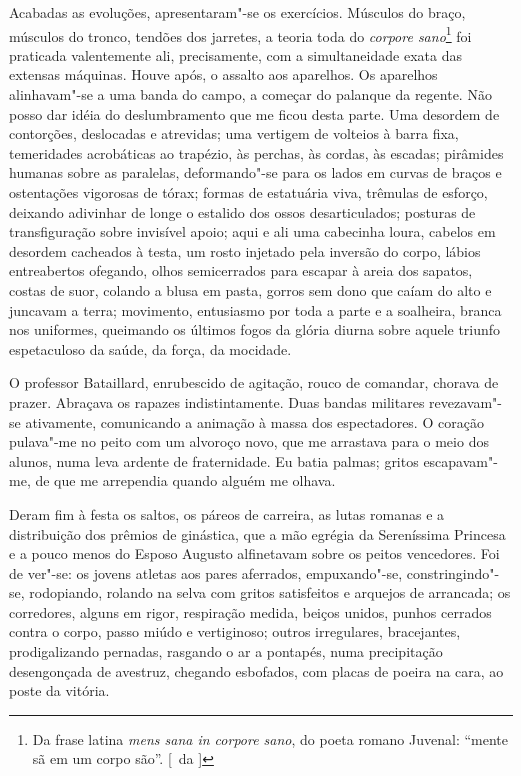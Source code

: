 Acabadas as evoluções, apresentaram"-se os
exercícios. Músculos do braço, músculos do tronco, tendões dos
jarretes, a teoria toda do \textit{corpore sano}\footnote{ Da frase latina 
\textit{mens sana in corpore sano}, do poeta romano Juvenal: 
``mente sã em um corpo são''. [~da ]} foi praticada valentemente ali,
precisamente, com a simultaneidade exata das extensas máquinas. Houve
após, o assalto aos aparelhos. Os aparelhos alinhavam"-se a uma banda
do campo, a começar do palanque da regente. Não posso dar idéia do
deslumbramento que me ficou desta parte. Uma desordem de contorções,
deslocadas e atrevidas; uma vertigem de volteios à barra fixa,
temeridades acrobáticas ao trapézio, às perchas, às cordas, às escadas;
pirâmides humanas sobre as paralelas, deformando"-se para os lados em
curvas de braços e ostentações vigorosas de tórax; formas de estatuária
viva, trêmulas de esforço, deixando adivinhar de longe o estalido dos
ossos desarticulados; posturas de transfiguração sobre invisível apoio;
aqui e ali uma cabecinha loura, cabelos em desordem cacheados à testa,
um rosto injetado pela inversão do corpo, lábios entreabertos ofegando,
olhos semicerrados para escapar à areia dos sapatos, costas de suor,
colando a blusa em pasta, gorros sem dono que caíam do alto e juncavam
a terra; movimento, entusiasmo por toda a parte e a soalheira, branca
nos uniformes, queimando os últimos fogos da glória diurna sobre aquele
triunfo espetaculoso da saúde, da força, da mocidade. 

O professor Bataillard, enrubescido de agitação, rouco de comandar, chorava de
prazer. Abraçava os rapazes indistintamente. Duas bandas militares
revezavam"-se ativamente, comunicando a animação à massa dos
espectadores. O coração pulava"-me no peito com um alvoroço novo, que
me arrastava para o meio dos alunos, numa leva ardente de fraternidade.
Eu batia palmas; gritos escapavam"-me, de que me arrependia quando
alguém me olhava. 

Deram fim à festa os saltos, os páreos de carreira,
as lutas romanas e a distribuição dos prêmios de ginástica, que a mão
egrégia da Sereníssima Princesa e a pouco menos do Esposo Augusto
alfinetavam sobre os peitos vencedores. Foi de ver"-se: os jovens
atletas aos pares aferrados, empuxando"-se, constringindo"-se,
rodopiando, rolando na selva com gritos satisfeitos e arquejos de
arrancada; os corredores, alguns em rigor, respiração medida, beiços
unidos, punhos cerrados contra o corpo, passo miúdo e vertiginoso;
outros irregulares, bracejantes, prodigalizando pernadas, rasgando o ar
a pontapés, numa precipitação desengonçada de avestruz, chegando
esbofados, com placas de poeira na cara, ao poste da vitória. 


